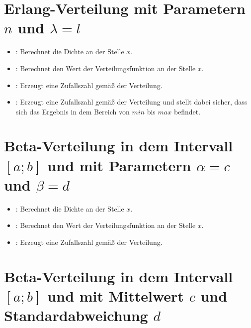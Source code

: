 \section{Erlang-Verteilung mit Parametern \texorpdfstring{$n$}{n} und \texorpdfstring{$\lambda=l$}{l}}

\begin{itemize}

\item
{}:
Berechnet die Dichte an der Stelle $x$.

\item
{}:
Berechnet den Wert der Verteilungsfunktion an der Stelle $x$.

\item
{}:
Erzeugt eine Zufallszahl gemäß der Verteilung.

\item
{}:
Erzeugt eine Zufallszahl gemäß der Verteilung und stellt dabei sicher, dass sich das Ergebnis in dem Bereich von $min$ bis $max$ befindet.

\end{itemize}



\section{Beta-Verteilung in dem Intervall \texorpdfstring{$[a;b]$}{[a;b]} und mit Parametern \texorpdfstring{$\alpha=c$}{c} und \texorpdfstring{$\beta=d$}{d}}

\begin{itemize}

\item
{}:
Berechnet die Dichte an der Stelle $x$.

\item
{}:
Berechnet den Wert der Verteilungsfunktion an der Stelle $x$.

\item
{}:
Erzeugt eine Zufallszahl gemäß der Verteilung.

\end{itemize}



\section{Beta-Verteilung in dem Intervall \texorpdfstring{$[a;b]$}{[a;b]} und mit Mittelwert \texorpdfstring{$c$}{c} und Standardabweichung \texorpdfstring{$d$}{d}}

